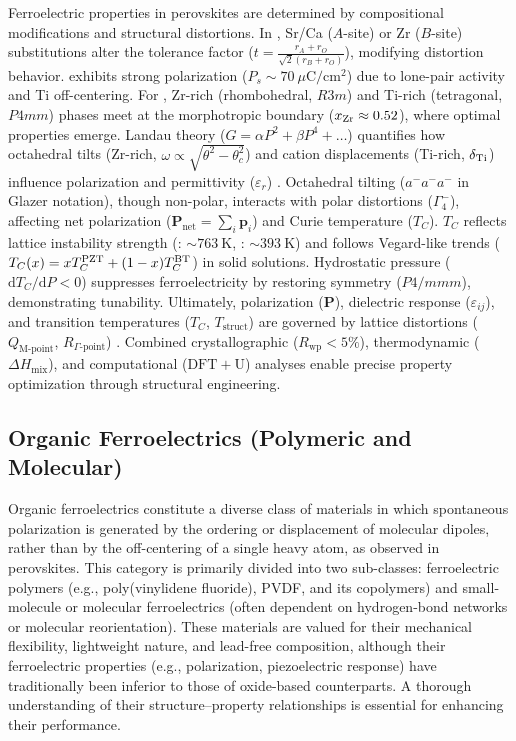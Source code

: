 \documentclass[a4paper,fleqn]{cas-sc}
\begin{document}
\par Ferroelectric properties in perovskites are determined by compositional modifications and structural distortions. In , Sr/Ca ($A$-site) or Zr ($B$-site) substitutions alter the tolerance factor ($t = \frac{r_A + r_O}{\sqrt{2}(r_B + r_O)}$), modifying distortion behavior.  exhibits strong polarization ($P_s \sim 70~\mu\mathrm{C}/\mathrm{cm}^2$) due to  lone-pair activity and Ti off-centering. For , Zr-rich (rhombohedral, $R3m$) and Ti-rich (tetragonal, $P4mm$) phases meet at the morphotropic boundary ($x_{\ce{Zr}} \approx 0.52$), where optimal properties emerge. Landau theory ($G = \alpha P^2 + \beta P^4 + \dots$) quantifies how octahedral tilts (Zr-rich, $\omega \propto \sqrt{\theta^2 - \theta_c^2}$) and cation displacements (Ti-rich, $\delta_{\ce{Ti}}$) influence polarization and permittivity ($\varepsilon_r$) \cite{aslla2021role}. Octahedral tilting ($a^-a^-a^-$ in Glazer notation), though non-polar, interacts with polar distortions ($\Gamma_4^-$), affecting net polarization ($\mathbf{P}_{\text{net}} = \sum_i \mathbf{p}_i$) and Curie temperature ($T_C$). $T_C$ reflects lattice instability strength (: $\sim 763~\mathrm{K}$, : $\sim 393~\mathrm{K}$) and follows Vegard-like trends ($T_C(x) = x T_C^{\ce{PZT}} + (1-x) T_C^{\ce{BT}}$) in solid solutions. Hydrostatic pressure ($\mathrm{d}T_C/\mathrm{d}P < 0$) suppresses ferroelectricity by restoring symmetry ($P4/mmm$), demonstrating tunability. Ultimately, polarization ($\mathbf{P}$), dielectric response ($\varepsilon_{ij}$), and transition temperatures ($T_C$, $T_{\text{struct}}$) are governed by lattice distortions ($Q_{\text{M-point}}$, $R_{\Gamma\text{-point}}$) \cite{aslla2021role}. Combined crystallographic ($R_{\text{wp}} < 5\%$), thermodynamic ($\Delta H_{\text{mix}}$), and computational ($\mathrm{DFT+U}$) analyses enable precise property optimization through structural engineering.

\subsection*{Organic Ferroelectrics (Polymeric and Molecular)}

\par Organic ferroelectrics constitute a diverse class of materials in which spontaneous polarization is generated by the ordering or displacement of molecular dipoles, rather than by the off-centering of a single heavy atom, as observed in perovskites. This category is primarily divided into two sub-classes: ferroelectric polymers (e.g., poly(vinylidene fluoride), PVDF, and its copolymers) and small-molecule or molecular ferroelectrics (often dependent on hydrogen-bond networks or molecular reorientation). These materials are valued for their mechanical flexibility, lightweight nature, and lead-free composition, although their ferroelectric properties (e.g., polarization, piezoelectric response) have traditionally been inferior to those of oxide-based counterparts. A thorough understanding of their structure–property relationships is essential for enhancing their performance. 
\end{document}
